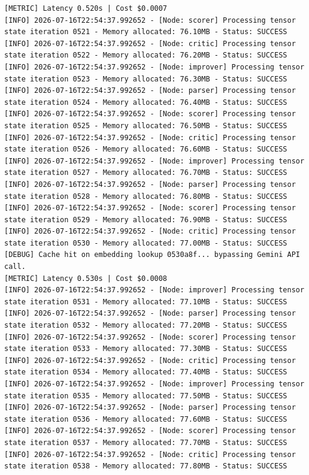 \documentclass[10pt,journal,compsoc]{IEEEtran}
\begin{document}
\begin{verbatim}
[METRIC] Latency 0.520s | Cost $0.0007
[INFO] 2026-07-16T22:54:37.992652 - [Node: scorer] Processing tensor state iteration 0521 - Memory allocated: 76.10MB - Status: SUCCESS
[INFO] 2026-07-16T22:54:37.992652 - [Node: critic] Processing tensor state iteration 0522 - Memory allocated: 76.20MB - Status: SUCCESS
[INFO] 2026-07-16T22:54:37.992652 - [Node: improver] Processing tensor state iteration 0523 - Memory allocated: 76.30MB - Status: SUCCESS
[INFO] 2026-07-16T22:54:37.992652 - [Node: parser] Processing tensor state iteration 0524 - Memory allocated: 76.40MB - Status: SUCCESS
[INFO] 2026-07-16T22:54:37.992652 - [Node: scorer] Processing tensor state iteration 0525 - Memory allocated: 76.50MB - Status: SUCCESS
[INFO] 2026-07-16T22:54:37.992652 - [Node: critic] Processing tensor state iteration 0526 - Memory allocated: 76.60MB - Status: SUCCESS
[INFO] 2026-07-16T22:54:37.992652 - [Node: improver] Processing tensor state iteration 0527 - Memory allocated: 76.70MB - Status: SUCCESS
[INFO] 2026-07-16T22:54:37.992652 - [Node: parser] Processing tensor state iteration 0528 - Memory allocated: 76.80MB - Status: SUCCESS
[INFO] 2026-07-16T22:54:37.992652 - [Node: scorer] Processing tensor state iteration 0529 - Memory allocated: 76.90MB - Status: SUCCESS
[INFO] 2026-07-16T22:54:37.992652 - [Node: critic] Processing tensor state iteration 0530 - Memory allocated: 77.00MB - Status: SUCCESS
[DEBUG] Cache hit on embedding lookup 0530a8f... bypassing Gemini API call.
[METRIC] Latency 0.530s | Cost $0.0008
[INFO] 2026-07-16T22:54:37.992652 - [Node: improver] Processing tensor state iteration 0531 - Memory allocated: 77.10MB - Status: SUCCESS
[INFO] 2026-07-16T22:54:37.992652 - [Node: parser] Processing tensor state iteration 0532 - Memory allocated: 77.20MB - Status: SUCCESS
[INFO] 2026-07-16T22:54:37.992652 - [Node: scorer] Processing tensor state iteration 0533 - Memory allocated: 77.30MB - Status: SUCCESS
[INFO] 2026-07-16T22:54:37.992652 - [Node: critic] Processing tensor state iteration 0534 - Memory allocated: 77.40MB - Status: SUCCESS
[INFO] 2026-07-16T22:54:37.992652 - [Node: improver] Processing tensor state iteration 0535 - Memory allocated: 77.50MB - Status: SUCCESS
[INFO] 2026-07-16T22:54:37.992652 - [Node: parser] Processing tensor state iteration 0536 - Memory allocated: 77.60MB - Status: SUCCESS
[INFO] 2026-07-16T22:54:37.992652 - [Node: scorer] Processing tensor state iteration 0537 - Memory allocated: 77.70MB - Status: SUCCESS
[INFO] 2026-07-16T22:54:37.992652 - [Node: critic] Processing tensor state iteration 0538 - Memory allocated: 77.80MB - Status: SUCCESS

\end{verbatim}
\end{document}
